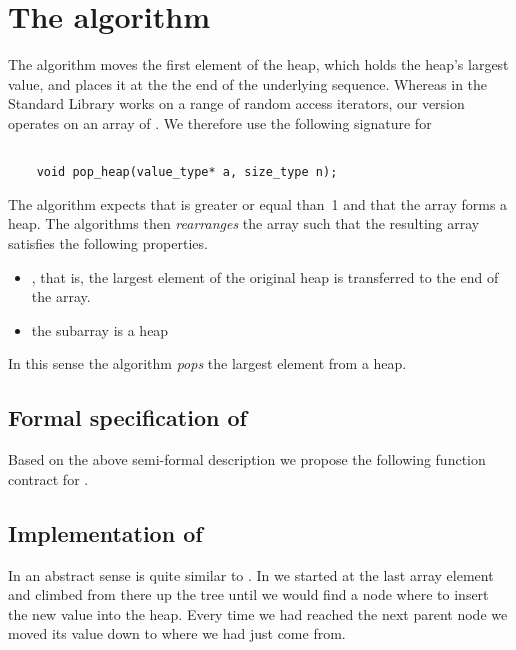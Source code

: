\section{The \popheap algorithm}

The algorithm \popheap moves the first element of the heap, which holds
the heap's largest value, and places it at the the end of the underlying sequence.
Whereas in the \cxx Standard Library \cite[\S 28.7.7.2]{cxx-17-draft}
\popheap works on a range of random access iterators,
our version operates on an array of .
We therefore use the following signature for \popheap

\begin{lstlisting}[style = acsl-block]

    void pop_heap(value_type* a, size_type n);
\end{lstlisting}

The \popheap algorithm expects that  is greater or equal than~1
and that the array  forms a heap.
The algorithms then \emph{rearranges} the array  such that the
resulting array satisfies the following properties.

\begin{itemize}
\item {}, that is, the largest element
of the original heap is transferred to the end of the array.

\item the subarray  is a heap
\end{itemize}

In this sense the algorithm \emph{pops} the largest element from a heap.

\subsection{Formal specification of \popheap}

Based on the above semi-formal description we propose the
following function contract for .



\subsection{Implementation of \popheap}

In an abstract sense \popheap is quite similar to \pushheap.
In  \pushheap we started at the last array element and 
climbed from there up the tree until we would find a node where to
insert the new value into the heap.
Every time we had reached the next parent node we
moved its value down to where we had just come from.

